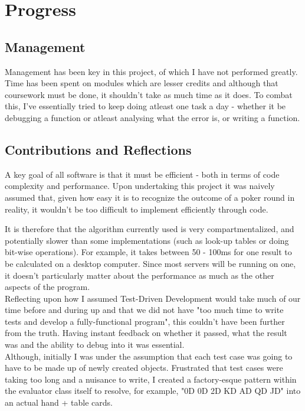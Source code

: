 \documentclass[11pt]{article}
\begin{document}
\section{Progress}
\subsection{Management}

Management has been key in this project, of which I have not performed greatly. Time has been spent on modules which are lesser credits and although that coursework must be done, it shouldn't take as much time as it does. To combat this, I've essentially tried to keep doing atleast one task a day - whether it be debugging a function or atleast analysing what the error is, or writing a function.


\subsection{Contributions and Reflections}

A key goal of all software is that it must be efficient - both in terms of code complexity and performance. Upon undertaking this project it was naively assumed that, given how easy it is to recognize the outcome of a poker round in reality, it wouldn't be too difficult to implement efficiently through code. 

It is therefore that the algorithm currently used is very compartmentalized, and potentially slower than some implementations (such as look-up tables or doing bit-wise operations). For example, it takes between 50 - 100ms for one result to be calculated on a desktop computer. Since most servers will be running on one, it doesn't particularly matter about the performance as much as the other aspects of the program.\\

Reflecting upon how I assumed Test-Driven Development would take much of our time before and during up and that we did not have "too much time to write tests and develop a fully-functional program", this couldn't have been further from the truth. Having instant feedback on whether it passed, what the result was and the ability to debug into it was essential. \\

Although, initially I was under the assumption that each test case was going to have to be made up of newly created objects. Frustrated that test cases were taking too long and a nuisance to write, I created a factory-esque pattern within the evaluator class itself to resolve, for example, "0D 0D 2D KD AD QD JD" into an actual hand + table cards.  \\
\end{document}
